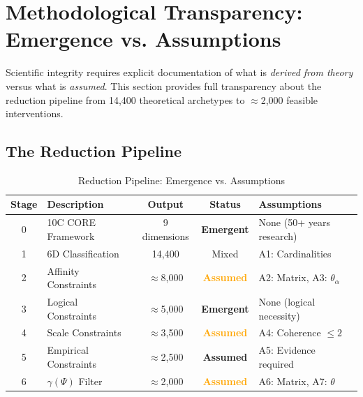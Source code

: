 \section{Methodological Transparency: Emergence vs. Assumptions}
\label{sec:17-transparency}

Scientific integrity requires explicit documentation of what is \textit{derived from theory} versus what is \textit{assumed}. This section provides full transparency about the reduction pipeline from 14,400 theoretical archetypes to $\approx$2,000 feasible interventions.

\subsection{The Reduction Pipeline}

\begin{table}[htbp]
\centering
\caption{Reduction Pipeline: Emergence vs. Assumptions}
\label{tab:17-reduction-pipeline}
\renewcommand{\arraystretch}{1.3}
\small
\begin{tabular}{@{}clccp{4.5cm}@{}}
\toprule
\textbf{Stage} & \textbf{Description} & \textbf{Output} & \textbf{Status} & \textbf{Assumptions} \\
\midrule
0 & 10C CORE Framework & 9 dimensions & \textcolor{green!60!black}{\textbf{Emergent}} & None (50+ years research) \\
1 & 6D Classification & 14,400 & Mixed & A1: Cardinalities \\
2 & Affinity Constraints & $\approx$8,000 & \textcolor{orange}{\textbf{Assumed}} & A2: Matrix, A3: $\theta_\alpha$ \\
3 & Logical Constraints & $\approx$5,000 & \textcolor{green!60!black}{\textbf{Emergent}} & None (logical necessity) \\
4 & Scale Constraints & $\approx$3,500 & \textcolor{orange}{\textbf{Assumed}} & A4: Coherence $\leq 2$ \\
5 & Empirical Constraints & $\approx$2,500 & \textcolor{red!60!black}{\textbf{Assumed}} & A5: Evidence required \\
6 & $\gamma(\Psi)$ Filter & $\approx$2,000 & \textcolor{orange}{\textbf{Assumed}} & A6: Matrix, A7: $\theta$ \\
\bottomrule
\end{tabular}
\end{table}


